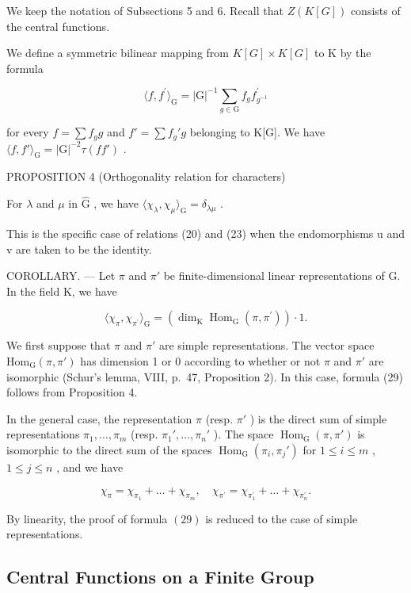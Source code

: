 We keep the notation of Subsections 5 and 6. Recall that \(Z(K[G])\) consists of the central functions.

We define a symmetric bilinear mapping from \(K[G] \times K[G]\) to K by the formula

\[
\langle f, f ^ {\prime} \rangle_ {\mathrm{G}} = | \mathrm{G} | ^ {- 1} \sum_ {g \in \mathrm{G}} f _ {g} f _ {g ^ {- 1}} ^ {\prime}\tag{28}
\]

for every \(f = \sum f_{g}g\) and \(f' = \sum f_{g}'g\) belonging to K{[}G{]}. We have \(\langle f, f' \rangle_{\mathrm{G}} = |\mathrm{G}|^{-2}\tau (ff')\) .

PROPOSITION 4 (Orthogonality relation for characters)

For \(\lambda\) and \(\mu\) in \(\hat{\mathrm{G}}\) , we have \(\langle \chi_{\lambda},\chi_{\mu}\rangle_{\mathrm{G}} = \delta_{\lambda \mu}\) .

This is the specific case of relations (20) and (23) when the endomorphisms u and v are taken to be the identity.

COROLLARY. --- Let \(\pi\) and \(\pi'\) be finite-dimensional linear representations of G. In the field K, we have

\[
\langle \chi_ {\pi}, \chi_ {\pi^ {\prime}} \rangle_ {\mathrm{G}} = (\dim_ {\mathrm{K}} \operatorname{Hom} _ {\mathrm{G}} (\pi , \pi^ {\prime})) \cdot 1.\tag{29}
\]

We first suppose that \(\pi\) and \(\pi'\) are simple representations. The vector space \(\mathrm{Hom}_{\mathrm{G}}(\pi, \pi')\) has dimension 1 or 0 according to whether or not \(\pi\) and \(\pi'\) are isomorphic (Schur's lemma, VIII, p.~47, Proposition 2). In this case, formula (29) follows from Proposition 4.

In the general case, the representation \(\pi\) (resp. \(\pi'\) ) is the direct sum of simple representations \(\pi_{1},\ldots,\pi_{m}\) (resp. \(\pi_{1}',\ldots,\pi_{n}'\) ). The space \(\operatorname{Hom}_{\mathrm{G}}(\pi,\pi')\) is isomorphic to the direct sum of the spaces \(\operatorname{Hom}_{\mathrm{G}}(\pi_{i},\pi_{j}')\) for \(1\leqslant i\leqslant m\) , \(1\leqslant j\leqslant n\) , and we have

\[
\chi_ {\pi} = \chi_ {\pi_ {1}} + \dots + \chi_ {\pi_ {m}}, \quad \chi_ {\pi^ {\prime}} = \chi_ {\pi_ {1} ^ {\prime}} + \dots + \chi_ {\pi_ {n} ^ {\prime}}.
\]

By linearity, the proof of formula \((29)\) is reduced to the case of simple representations.

\subsection{Central Functions on a Finite Group}

